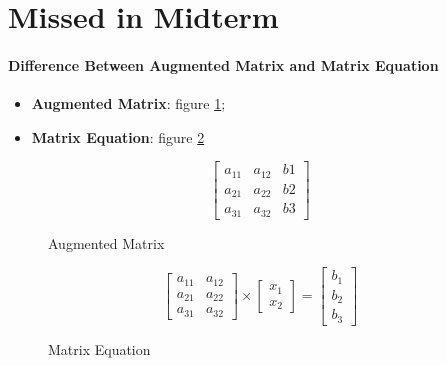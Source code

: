 \section{Missed in Midterm}

\paragraph{Difference Between Augmented Matrix and Matrix Equation}

\begin{itemize}
  \item \textbf{Augmented Matrix}: figure \ref{missed sample augmented matrix};
  \item \textbf{Matrix Equation}: figure \ref{missed sample matrix equation}
\end{itemize}

\begin{figure}[h!]\label{missed sample augmented matrix}
  \caption{Augmented Matrix}
  \begin{displaymath}
    \begin{bmatrix}
      a_{11} & a_{12} & b{1} \\ 
      a_{21} & a_{22} & b{2} \\ 
      a_{31} & a_{32} & b{3}
    \end{bmatrix}
  \end{displaymath}
\end{figure}

\begin{figure}[h!]\label{missed sample matrix equation}
  \caption{Matrix Equation}
  \begin{displaymath}
    \begin{bmatrix}
      a_{11} & a_{12} \\ 
      a_{21} & a_{22} \\ 
      a_{31} & a_{32}
    \end{bmatrix}
    \times 
    \begin{bmatrix}
      x_{1} \\ 
      x_{2} 
    \end{bmatrix}
    =
    \begin{bmatrix}
      b_{1} \\ 
      b_{2} \\ 
      b_{3}
    \end{bmatrix}
  \end{displaymath}
\end{figure}